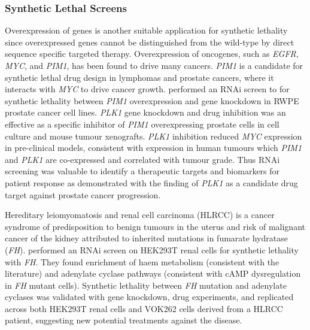 \subsubsection{Synthetic Lethal Screens}

Overexpression of genes is another suitable application for synthetic lethality since overexpressed genes cannot be distinguished from the wild-type by direct sequence specific targeted therapy. Overexpression of oncogenes, such as \textit{EGFR}, \textit{MYC}, and \textit{PIM1}, has been found to drive many cancers. \textit{PIM1} is a candidate for synthetic lethal drug design in lymphomas and prostate cancers, where it interacts with \textit{MYC} to drive cancer growth. \citet{vanderMeer2014} performed an RNAi screen to for synthetic lethality between \textit{PIM1} overexpression and gene knockdown in RWPE prostate cancer cell lines. \textit{PLK1} gene knockdown and drug inhibition was an effective as a specific inhibitor of \textit{PIM1} overexpressing prostate cells in cell culture and mouse tumour xenografts. \textit{PLK1} inhibition reduced \textit{MYC} expression in pre-clinical models, consistent with expression in human tumours which \textit{PIM1} and \textit{PLK1} are co-expressed and correlated with tumour grade. Thus RNAi screening was valuable to identify a therapeutic targets and biomarkers for patient response as demonstrated with the finding of \textit{PLK1} as a candidate drug target against prostate cancer progression.  

Hereditary leiomyomatosis and renal cell carcinoma (HLRCC) is a cancer syndrome of predisposition to benign tumours in the uterus and risk of malignant cancer of the kidney attributed to inherited mutations in fumarate hydratase (\textit{FH}). \citet{Boettcher2014} performed an RNAi screen on HEK293T renal cells for synthetic lethality with \textit{FH}. They found enrichment of haem metabolism (consistent with the literature) and adenylate cyclase pathways (consistent with cAMP dysregulation in \textit{FH} mutant cells). Synthetic lethality between \textit{FH} mutation and adenylate cyclases was validated with gene knockdown, drug experiments, and replicated across both HEK293T renal cells and VOK262 cells derived from a HLRCC patient, suggesting new potential treatments against the disease. %


